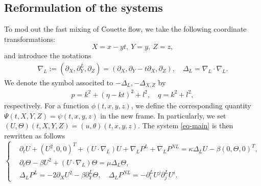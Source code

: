 \documentclass[12pt]{article}
\numberwithin{equation}{section}
\begin{document}
    \subsection{Reformulation of the systems}
	To mod out the fast mixing of Couette flow, we take the following coordinate transformations:
	\begin{equation*}
		X=x-yt,\ Y=y,\ Z=z,
	\end{equation*}
    and introduce the notations
    \begin{align}
        \nabla_L:=(\partial_X,\partial_Y^L,\partial_Z)=(\partial_X,\partial_Y-t\partial_X,\partial_Z),\quad \Delta_L=\nabla_L\cdot\nabla_L.\label{def-cot}
    \end{align}
    We denote the symbol associted to $-\Delta_L,-\Delta_{X,Z}$ by
    \begin{align*}
        p=k^2+(\eta-kt)^2+l^2, \quad q=k^2+l^2,
    \end{align*}
    respectively. For a function $\phi(t,x,y,z)$, we define the corresponding quantity $\Psi(t,X,Y,Z)=\psi(t,x,y,z)$ in the new frame. In particularly, we set $(U,\Theta)(t,X,Y,Z)=(u,\theta)(t,x,y,z)$. The system \eqref{eq-main} is then rewritten as follows
	\begin{equation*}
		\left\{
		\begin{aligned}
			&\partial_t U+(U^2,0,0)^T+(U\cdot\nabla_L)U+\nabla_L P^L+\nabla_LP^{NL}=\kappa \Delta_L U-\beta(0,\Theta,0)^T,\\
			&\partial_t \Theta-\beta U^2+(U\cdot\nabla_L)\Theta=\mu\Delta_L\Theta,\\
            &\Delta_LP^L=-2\partial_XU^2-\beta\partial_Y^L\Theta,\quad \Delta_LP^{NL}=-\partial_i^LU^j\partial_j^LU^i.
		\end{aligned}
		\right.
	\end{equation*}
	
\end{document}
